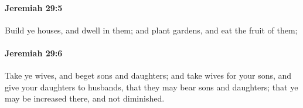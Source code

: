 		\paragraph{Jeremiah 29:5} %
			\label{JEREMIAH-29-5}

			Build ye houses, and dwell in them; and plant gardens, and eat the fruit of them;


		\paragraph{Jeremiah 29:6} %
			\label{JEREMIAH-29-6}

			Take ye wives, and beget sons and daughters; and take wives for your sons, and give your daughters to husbands, that they may bear sons and daughters; that ye may be increased there, and not diminished.


